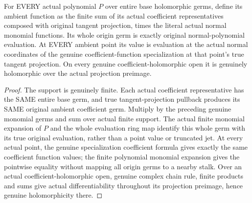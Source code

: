 \begin{lemma}
\label{hir:relative-normal-central-literal-polynomial-functions}
\leanok
For EVERY actual polynomial $P$ over entire base holomorphic germs, define its ambient function as the finite sum of its actual coefficient representatives composed with original tangent projection, times the literal actual normal monomial functions. Its whole origin germ is exactly original normal-polynomial evaluation. At EVERY ambient point its value is evaluation at the actual normal coordinates of the genuine coefficient-function specialization at that point's true tangent projection. On every genuine coefficient-holomorphic open it is genuinely holomorphic over the actual projection preimage.
\end{lemma}
\begin{proof}
The support is genuinely finite. Each actual coefficient representative has the SAME entire base germ, and true tangent-projection pullback produces its SAME original ambient coefficient germ. Multiply by the preceding genuine monomial germs and sum over actual finite support. The actual finite monomial expansion of $P$ and the whole evaluation ring map identify this whole germ with its true original evaluation, rather than a point value or truncated jet. At every actual point, the genuine specialization coefficient formula gives exactly the same coefficient function values; the finite polynomial monomial expansion gives the pointwise equality without mapping all origin germs to a nearby stalk. Over an actual coefficient-holomorphic open, genuine complex chain rule, finite products and sums give actual differentiability throughout its projection preimage, hence genuine holomorphicity there.
\end{proof}

